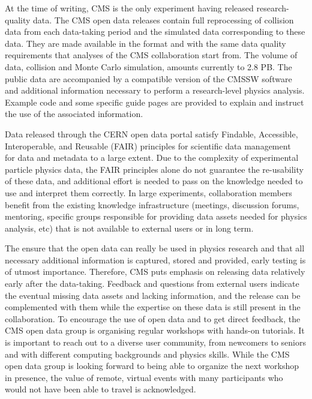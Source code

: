 \documentclass[11pt]{article}
\begin{document}
At the time of writing, CMS is the only experiment having released research-quality data. The CMS open data releases contain full reprocessing of collision data from each data-taking period and the simulated data corresponding to these data. They are made available in the format and with the same data quality requirements that analyses of the CMS collaboration start from. The volume of data, collision and Monte Carlo simulation, amounts currently to 2.8 PB. The public data are accompanied by a compatible version of the CMSSW software and additional information necessary to perform a research-level physics analysis. Example code and some specific guide pages are provided to explain and instruct the use of the associated information.

Data released through the CERN open data portal satisfy Findable, Accessible, Interoperable, and Reusable (FAIR) principles for scientific data management~\cite{FAIR-paper} for data and metadata to a large extent. Due to the complexity of experimental particle physics data, the FAIR principles alone do not guarantee the re-usability of these data, and additional effort is needed to pass on the knowledge needed to use and interpret them correctly. In large experiments, collaboration members benefit from the existing knowledge infrastructure (meetings, discussion forums, mentoring, specific groups responsible for providing data assets needed for physics analysis, etc) that is not available to external users or in long term. 


The ensure that the open data can really be used in physics research and that all necessary additional information is captured, stored and provided, early testing is of utmost importance. Therefore, CMS puts emphasis on releasing data relatively early after the data-taking. Feedback and questions from external users indicate the eventual missing data assets and lacking information, and the release can be complemented with them while the expertise on these data is still present in the collaboration. To encourage the use of open data and to get direct feedback, the CMS open data group is organising regular workshops with hands-on tutorials. It is important to reach out to a diverse user community, from newcomers to seniors and with different computing backgrounds and physics skills. While the CMS open data group is looking forward to being able to organize the next workshop in presence, the value of remote, virtual events with many participants who would not have been able to travel is acknowledged.
\end{document}
